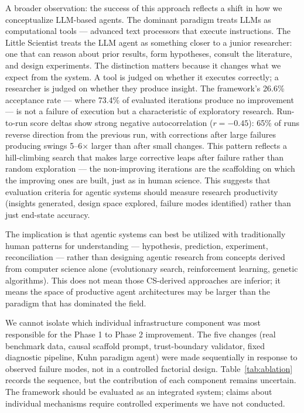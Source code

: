 \documentclass[11pt,a4paper]{article}
\begin{document}
A broader observation: the success of this approach reflects a shift in how we conceptualize LLM-based agents. The dominant paradigm treats LLMs as computational tools --- advanced text processors that execute instructions. The Little Scientist treats the LLM agent as something closer to a junior researcher: one that can reason about prior results, form hypotheses, consult the literature, and design experiments. The distinction matters because it changes what we expect from the system. A tool is judged on whether it executes correctly; a researcher is judged on whether they produce insight. The framework's 26.6\% acceptance rate --- where 73.4\% of evaluated iterations produce no improvement --- is not a failure of execution but a characteristic of exploratory research. Run-to-run score deltas show strong negative autocorrelation ($r = -0.45$): 65\% of runs reverse direction from the previous run, with corrections after large failures producing swings 5--6$\times$ larger than after small changes. This pattern reflects a hill-climbing search that makes large corrective leaps after failure rather than random exploration --- the non-improving iterations are the scaffolding on which the improving ones are built, just as in human science. This suggests that evaluation criteria for agentic systems should measure research productivity (insights generated, design space explored, failure modes identified) rather than just end-state accuracy.

The implication is that agentic systems can best be utilized with traditionally human patterns for understanding --- hypothesis, prediction, experiment, reconciliation --- rather than designing agentic research from concepts derived from computer science alone (evolutionary search, reinforcement learning, genetic algorithms). This does not mean those CS-derived approaches are inferior; it means the space of productive agent architectures may be larger than the paradigm that has dominated the field.

We cannot isolate which individual infrastructure component was most responsible for the Phase 1 to Phase 2 improvement. The five changes (real benchmark data, causal scaffold prompt, trust-boundary validator, fixed diagnostic pipeline, Kuhn paradigm agent) were made sequentially in response to observed failure modes, not in a controlled factorial design. Table~\ref{tab:ablation} records the sequence, but the contribution of each component remains uncertain. The framework should be evaluated as an integrated system; claims about individual mechanisms require controlled experiments we have not conducted.
\end{document}

